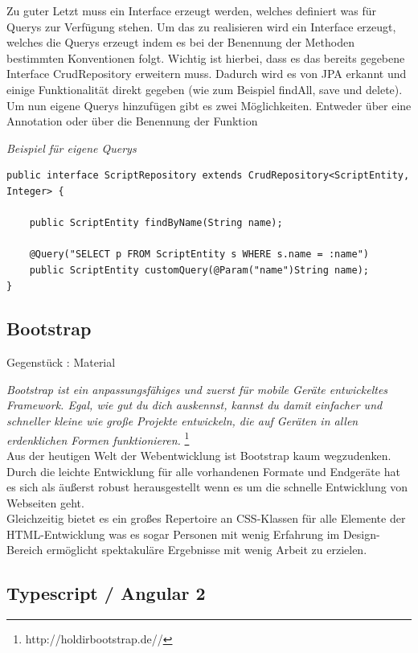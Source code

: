 Zu guter Letzt muss ein Interface erzeugt werden, welches definiert was für Querys zur Verfügung stehen. Um das zu realisieren wird ein Interface erzeugt, welches die Querys erzeugt indem es bei der Benennung der Methoden bestimmten Konventionen folgt. Wichtig ist hierbei, dass es das bereits gegebene Interface CrudRepository erweitern muss. Dadurch wird es von JPA erkannt und einige Funktionalität direkt gegeben (wie zum Beispiel findAll, save und delete).
Um nun eigene Querys hinzufügen gibt es zwei Möglichkeiten. Entweder über eine Annotation oder über die Benennung der Funktion

\begin{minipage}{\textwidth}
\emph{Beispiel für eigene Querys}
\begin{lstlisting}
public interface ScriptRepository extends CrudRepository<ScriptEntity, Integer> {

	public ScriptEntity findByName(String name);
	
	@Query("SELECT p FROM ScriptEntity s WHERE s.name = :name")
	public ScriptEntity customQuery(@Param("name")String name);
}
\end{lstlisting}
\end{minipage}

\subsection{Bootstrap}

Gegenstück : Material

\emph{\glqq   
Bootstrap ist ein anpassungsfähiges und zuerst für mobile Geräte entwickeltes Framework. Egal, wie gut du dich auskennst, kannst du damit einfacher und schneller kleine wie große Projekte entwickeln, die auf Geräten in allen erdenklichen Formen funktionieren.
\grqq} \footnote{http://holdirbootstrap.de//} \\

Aus der heutigen Welt der Webentwicklung ist Bootstrap kaum wegzudenken. Durch die leichte Entwicklung für alle vorhandenen Formate und Endgeräte hat es sich als äußerst robust herausgestellt wenn es um die schnelle Entwicklung von Webseiten geht. \\
Gleichzeitig bietet es ein großes Repertoire an CSS-Klassen für alle Elemente der HTML-Entwicklung was es sogar Personen mit wenig Erfahrung im Design-Bereich ermöglicht spektakuläre Ergebnisse mit wenig Arbeit zu erzielen.



\subsection{Typescript / Angular 2}

